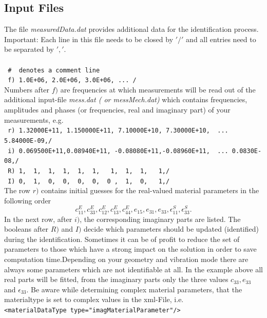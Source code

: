 \subsection{Input Files}
The file  {\em measuredData.dat} provides additional data for the identification process. 
Important: Each line in this file needs to be closed by $'/'$ and all entries need to be separated by $','$.\\ \\
\verb! #  denotes a comment line !\\
\verb! f) 1.0E+06, 2.0E+06, 3.0E+06, ... / ! \\
Numbers after $f)$ are frequencies at which measurements will be read out of the additional input-file {\it mess.dat  ( or messMech.dat)} which contains frequencies, amplitudes and phases (or frequencies, real and imaginary part) of your measurements, e.g. \\
\noindent 
\verb! r) 1.32000E+11, 1.150000E+11, 7.10000E+10, 7.30000E+10,  ... 5.84000E-09,/ ! \\
\verb! i) 0.069500E+11,0.08940E+11, -0.08080E+11,-0.08960E+11,  ... 0.0830E-08,/!\\
\verb! R) 1,  1,  1,  1,  1,  1,   1,  1,  1,   1,/ !\\
\verb! I) 0,  1,  0,  0,  0,  0,  0 ,  1,  0,   1,/ !\\

\noindent The row $r)$ contains initial guesses for the real-valued material parameters in the following order\\ $$c_{11}^E, c_{33}^E, c_{12}^E, c_{13}^E, c_{44}^E, e_{15}, e_{31}, e_{33}, \epsilon_{11}^S, \epsilon_{33}^S.$$ In the next row, after $i)$, the corresponding imaginary parts are listed. The booleans after $R)$ and $I)$ decide which parameters should be updated (identified) during the identification. Sometimes it can be of profit to reduce the set of parameters to those which have a strong impact on the solution in order to save computation time.Depending on your geometry and vibration mode there are always some parameters which are not identifiable at all. In the example above all real parts will be fitted, from the imaginary parts only the three values $c_{33},e_{33}$ and $\epsilon_{33}$. Be aware while determining complex material parameters, that the materialtype is set to complex values in the xml-File, i.e.\\ \noindent \verb!<materialDataType type="imagMaterialParameter"/>! \\
\noindent 


